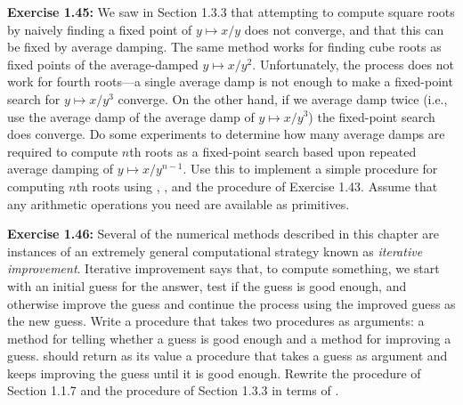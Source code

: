 \textbf{Exercise 1.45:} We saw in Section 1.3.3 that attempting to compute square roots by naively finding a fixed point of $y \mapsto x/y$ does not converge, and that this can be fixed by average damping. The same method works for finding cube roots as fixed points of the average-damped $y \mapsto x/y^2$. Unfortunately, the process does not work for fourth roots---a single average damp is not enough to make a fixed-point search for $y \mapsto x/y^3$ converge. On the other hand, if we average damp twice (i.e., use the average damp of the average damp of $y \mapsto x/y^3$) the fixed-point search does converge. Do some experiments to determine how many average damps are required to compute $n$th roots as a fixed-point search based upon repeated average damping of $y \mapsto x/y^{n-1}$. Use this to implement a simple procedure for computing $n$th roots using , , and the  procedure of Exercise 1.43. Assume that any arithmetic operations you need are available as primitives.

\textbf{Exercise 1.46:} Several of the numerical methods described in this chapter are instances of an extremely general computational strategy known as \emph{iterative improvement}. Iterative improvement says that, to compute something, we start with an initial guess for the answer, test if the guess is good enough, and otherwise improve the guess and continue the process using the improved guess as the new guess. Write a procedure  that takes two procedures as arguments: a method for telling whether a guess is good enough and a method for improving a guess.  should return as its value a procedure that takes a guess as argument and keeps improving the guess until it is good enough. Rewrite the  procedure of Section 1.1.7 and the  procedure of Section 1.3.3 in terms of .